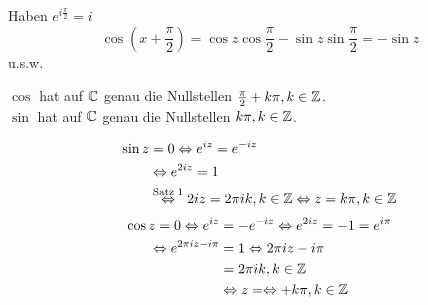 \documentclass[../ana2.tex]{subfiles}
\begin{document}
\begin{bew}
    Haben \( e^{i\frac{\pi}{2}} = i \)
    \[ \cos \left(x + \frac{\pi}{2}\right) 
    = \cos z \cos \frac{\pi}{2} - \sin z \sin \frac{\pi}{2} = -\sin z \]
    u.s.w.
\end{bew}
\begin{satz}
    \( \cos \) hat auf \( \mathbb{C} \) genau die Nullstellen 
    \( \frac{\pi}{2} + k \pi, k\in\mathbb{Z} \).\\
    \( \sin \) hat auf \( \mathbb{C} \) genau die Nullstellen 
    \( k \pi, k\in\mathbb{Z} \).
\end{satz}
\begin{bew}
    \begin{align*}
        \sin z &= 0 \Leftrightarrow e^{iz} = e^{-iz} \\
        &\Leftrightarrow e^{2iz} = 1 \\
        &\overset{\text{Satz 1}}{\Leftrightarrow} 2iz = 2\pi ik, k \in \mathbb{Z} 
        \Leftrightarrow z = k\pi, k \in \mathbb{Z}
    \end{align*}
    \begin{align*}
        \cos z = 0 \Leftrightarrow e^{iz}
        &= -e^{-iz} \Leftrightarrow e^{2iz} = -1 = e^{i\pi} \\
        \Leftrightarrow e^{2\pi iz - i\pi} 
        &= 1 \Leftrightarrow 2\pi iz - i\pi \\
        &= 2\pi ik, k \in \mathbb{Z} \\
        &\Leftrightarrow z = \Leftrightarrow + k \pi, k \in \mathbb{Z}
    \end{align*}
\end{bew}
\end{document}
